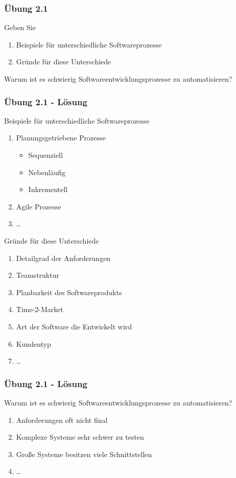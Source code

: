 \begin{frame}
\frametitle{Übung 2.1}
	Geben Sie
	\begin{enumerate}
		\item Beispiele für unterschiedliche Softwareprozesse
		\item Gründe für diese Unterschiede
	\end{enumerate}
	Warum ist es schwierig Softwareentwicklungsprozesse zu automatisieren?
\end{frame}

\ifloesung
\begin{frame}
\frametitle{Übung 2.1 - Lösung}
	\scriptsize
	Beispiele für unterschiedliche Softwareprozesse
	\begin{enumerate}
		\item Planungsgetriebene Prozesse
		\begin{itemize}
			\item Sequenziell
			\item Nebenläufig
			\item Inkrementell
		\end{itemize}
		\item Agile Prozesse
		\item \ldots
	\end{enumerate}
	\bigskip
	Gründe für diese Unterschiede
	\begin{enumerate}
		\item Detailgrad der Anforderungen
		\item Teamstruktur
		\item Planbarkeit des Softwareprodukts
		\item Time-2-Market
		\item Art der Software die Entwickelt wird
		\item Kundentyp
		\item \ldots
	\end{enumerate}
	\normalsize
\end{frame}

\begin{frame}
\frametitle{Übung 2.1 - Lösung}
	\scriptsize
	Warum ist es schwierig Softwareentwicklungsprozesse zu automatisieren?
	\begin{enumerate}
		\item Anforderungen oft nicht final
		\item Komplexe Systeme sehr schwer zu testen
		\item Große Systeme besitzen viele Schnittstellen
		\item \ldots
	\end{enumerate}
	\normalsize
\end{frame}
\fi

